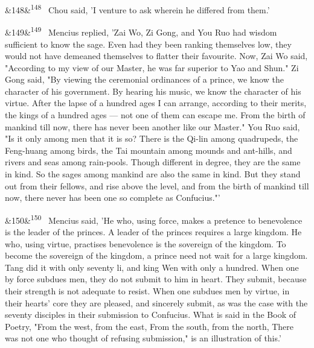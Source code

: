 \documentclass[12pt]{article}
\newcommand{\para}[1][]{\par\noindent\ifx&#1&\else\textsuperscript{\footnotesize #1}~\fi}
\begin{document}
\para[148] Chou said, 'I venture to ask wherein he differed from them.'

\para[149] Mencius replied, 'Zai Wo, Zi Gong, and You Ruo had wisdom sufficient to know the sage. Even had they been ranking themselves low, they would not have demeaned themselves to flatter their favourite. Now, Zai Wo said, "According to my view of our Master, he was far superior to Yao and Shun." Zi Gong said, "By viewing the ceremonial ordinances of a prince, we know the character of his government. By hearing his music, we know the character of his virtue. After the lapse of a hundred ages I can arrange, according to their merits, the kings of a hundred ages --- not one of them can escape me. From the birth of mankind till now, there has never been another like our Master." You Ruo said, "Is it only among men that it is so? There is the Qi-lin among quadrupeds, the Feng-huang among birds, the Tai mountain among mounds and ant-hills, and rivers and seas among rain-pools. Though different in degree, they are the same in kind. So the sages among mankind are also the same in kind. But they stand out from their fellows, and rise above the level, and from the birth of mankind till now, there never has been one so complete as Confucius."'

\para[150] Mencius said, 'He who, using force, makes a pretence to benevolence is the leader of the princes. A leader of the princes requires a large kingdom. He who, using virtue, practises benevolence is the sovereign of the kingdom. To become the sovereign of the kingdom, a prince need not wait for a large kingdom. Tang did it with only seventy li, and king Wen with only a hundred. When one by force subdues men, they do not submit to him in heart. They submit, because their strength is not adequate to resist. When one subdues men by virtue, in their hearts' core they are pleased, and sincerely submit, as was the case with the seventy disciples in their submission to Confucius. What is said in the Book of Poetry, "From the west, from the east, From the south, from the north, There was not one who thought of refusing submission," is an illustration of this.'
\end{document}
